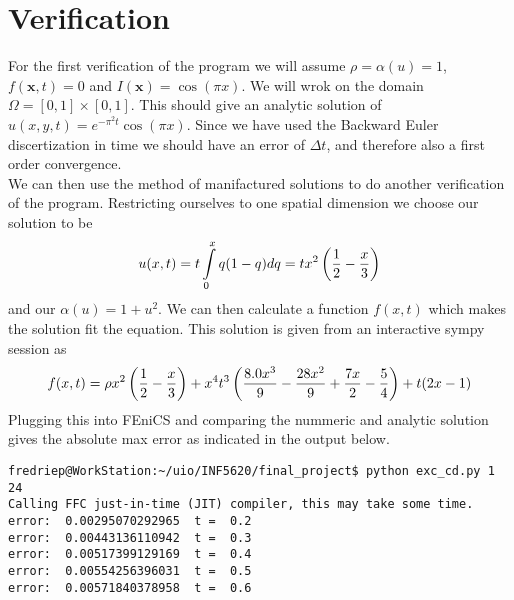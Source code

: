 \documentclass[a4paper,english, 10pt, twoside]{article}
\begin{document}
\section{Verification}
For the first verification of the program we will assume $\rho = \alpha(u) = 1$, $f(\mathbf{x},t) = 0$ and $I(\mathbf{x}) = \cos(\pi x)$. We 
will wrok on the domain $\Omega = [0,1]\times[0,1]$. This should give an analytic solution of $u(x,y,t) = e^{-\pi^2t}\cos(\pi x)$. Since we have used 
the Backward Euler discertization in time we should have an error of $\Delta t$, and therefore also a first order convergence. \\
We can then use the method of manifactured solutions to do another verification of the program. Restricting ourselves to one spatial dimension we 
choose our solution to be 
\begin{equation}
 u(x,t) = t\int\limits_0^xq(1-q)dq = tx^2\left({1\over2}-{x\over3}\right)
\end{equation}
and our $\alpha(u) = 1+u^2$. We can then calculate a function $f(x,t)$ which makes the solution fit the equation. This solution is given from an 
interactive sympy session as 
\begin{equation}
 f(x,t) = \rho x^2\left({1\over2}-{x\over3}\right) +x^4t^3\left({8.0x^3\over9} -{28x^2\over9} +{7x\over2} -{5\over4}\right) +t(2x -1)
\end{equation}
Plugging this into FEniCS and comparing the nummeric and analytic solution gives the absolute max error as indicated in the output below.
\begin{lstlisting}
fredriep@WorkStation:~/uio/INF5620/final_project$ python exc_cd.py 1 24
Calling FFC just-in-time (JIT) compiler, this may take some time.
error:  0.00295070292965  t =  0.2
error:  0.00443136110942  t =  0.3
error:  0.00517399129169  t =  0.4
error:  0.00554256396031  t =  0.5
error:  0.00571840378958  t =  0.6
\end{lstlisting}
\end{document}
